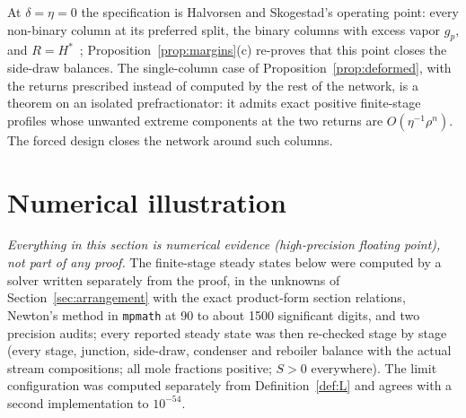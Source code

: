 \documentclass[11pt,a4paper]{report}
\newcommand{\Hs}{H^{*}}
\begin{document}
\begin{remark}
At \(\delta=\eta=0\) the specification is Halvorsen and Skogestad's operating point: every non-binary column at its preferred
split, the binary columns with excess vapor \(g_p\), and \(R=\Hs\)~\autocite{HS3}; Proposition~\ref{prop:margins}(c) re-proves
that this point closes the side-draw balances. The single-column case of Proposition~\ref{prop:deformed}, with the returns
prescribed instead of computed by the rest of the network, is a theorem on an isolated prefractionator: it admits exact
positive finite-stage profiles whose unwanted extreme components at the two returns are \(O(\eta^{-1}\rho^n)\). The forced
design closes the network around such columns.
\end{remark}

\section{Numerical illustration}\label{sec:numerics}

\emph{Everything in this section is numerical evidence (high-precision floating point), not part of any proof.} The
finite-stage steady states below were computed by a solver written separately from the proof, in the unknowns of
Section~\ref{sec:arrangement} with the exact product-form section relations, Newton's method in \texttt{mpmath} at 90 to
about 1500 significant digits, and two precision audits; every reported steady state was then re-checked stage by stage
(every stage, junction, side-draw, condenser and reboiler balance with the actual stream compositions; all mole fractions
positive; \(S>0\) everywhere). The limit configuration was computed separately from Definition~\ref{def:L} and agrees with
a second implementation to \(10^{-54}\).
\end{document}
